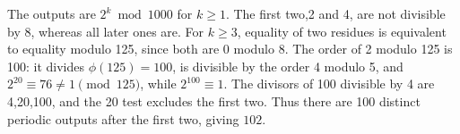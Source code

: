 The outputs are $2^k\bmod1000$ for $k\ge1$. The first two,2 and 4, are not divisible by 8, whereas all later ones are. For $k\ge3$, equality of two residues is equivalent to equality modulo 125, since both are 0 modulo 8. The order of 2 modulo 125 is 100: it divides $\phi(125)=100$, is divisible by the order 4 modulo 5, and $2^{20}\equiv76\ne1\pmod{125}$, while $2^{100}\equiv1$. The divisors of 100 divisible by 4 are 4,20,100, and the 20 test excludes the first two. Thus there are 100 distinct periodic outputs after the first two, giving $\boxed{102}$.
